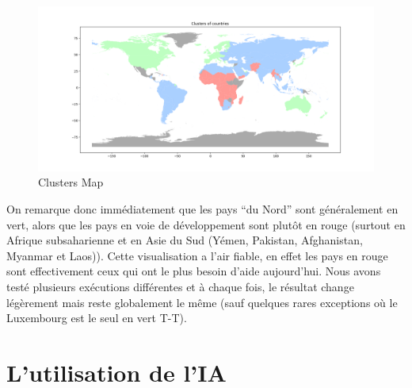 \documentclass{article}
\begin{document}
\begin{figure}[H]
    \centering
    \includegraphics[width=\linewidth]{plot/clusters_map.png}
    \caption{Clusters Map}
    \label{fig:clusters_map}
\end{figure}

\noindent On remarque donc immédiatement que les pays “du Nord” sont généralement en vert, alors que les pays en voie de développement sont plutôt en rouge (surtout en Afrique subsaharienne et en Asie du Sud (Yémen, Pakistan, Afghanistan, Myanmar et Laos)). Cette visualisation a l’air fiable, en effet les pays en rouge sont effectivement ceux qui ont le plus besoin d’aide aujourd’hui. Nous avons testé plusieurs exécutions différentes et à chaque fois, le résultat change légèrement mais reste globalement le même (sauf quelques rares exceptions où le Luxembourg est le seul en vert T-T).

\newpage
\section{L'utilisation de l'IA}
\end{document}
